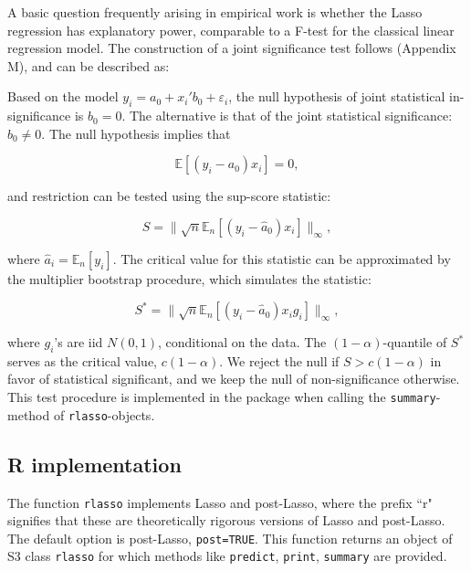 \documentclass{amsart}\usepackage[]{graphicx}\usepackage[]{color}
\newcommand{\code}[1]{\texttt{#1}}
\begin{document}
A basic question frequently arising in empirical work is whether the Lasso regression has explanatory power, comparable to a F-test for the classical linear regression model. The construction of a joint significance test follows \citep{CCK:AOS13} (Appendix M), and can be described as: 

Based on the model $ y_i =a_0 + x_i' b_0 + \varepsilon_i$, the null hypothesis of joint statistical in-significance is  $b_0 = 0$. The alternative is that of the joint statistical significance: $b_0 \neq 0$. The null hypothesis implies that
 
$$ \mathbb{E} \left[ (y_i - a_0) x_i \right] = 0,$$
 
and restriction can be tested using the sup-score statistic:
 
$$S = \| \sqrt{n} \mathbb{E}_n \left[ (y_i - \hat a_0) x_i \right] \|_\infty,$$

where $\hat a_i =  \mathbb{E}_n [y_i]$.  The critical value for this statistic can be approximated  by the multiplier bootstrap procedure, which simulates the statistic:
 
$$ S^* = \| \sqrt{n} \mathbb{E}_n \left[ (y_i - \hat a_0) x_i g_i \right] \|_\infty,$$
 
where $g_i$'s are iid $N(0,1)$, conditional on the data. The $(1-\alpha)$-quantile of $S^*$ serves as the critical value, $c(1-\alpha)$. We reject the null if $S > c(1-\alpha)$ in favor of statistical significant, and we keep the null of non-significance otherwise. This test procedure is implemented in the package when calling the \texttt{summary}-method of \texttt{rlasso}-objects.


\subsection*{R implementation}  The function \texttt{rlasso} implements Lasso and post-Lasso, where the prefix ``r" signifies that these are theoretically rigorous versions of Lasso and post-Lasso. The default option is post-Lasso, \code{post=TRUE}.  This function returns an object of S3 class \code{rlasso} for which methods like \code{predict}, \code{print}, \code{summary} are provided.
\end{document}
